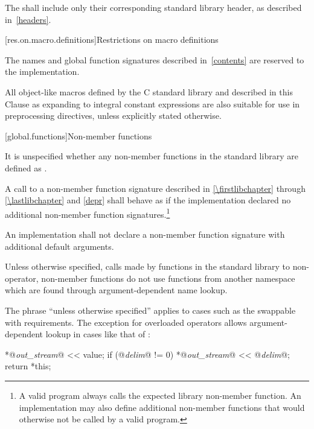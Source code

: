 \pnum
The 
shall include only their corresponding \Cpp{} standard library header,
as described in~\ref{headers}.

[res.on.macro.definitions]{Restrictions on macro definitions}
%

\pnum
The names and global function signatures described in~\ref{contents} are
reserved to the implementation.
%
%
%
%
%

\pnum
All object-like macros defined by the C standard library and described in this
Clause as expanding to integral constant expressions are also suitable for use
in  preprocessing directives, unless
explicitly stated otherwise.

[global.functions]{Non-member functions}

\pnum
It is unspecified whether any
non-member
functions in the \Cpp{} standard library are defined as
.

\pnum
A call to a non-member function signature
described in \ref{\firstlibchapter} through \ref{\lastlibchapter} and
\ref{depr} shall behave as if the implementation declared no additional
non-member function signatures.\footnote{A valid \Cpp{} program always
calls the expected library non-member function. An implementation may
also define additional non-member functions that would otherwise not
be called by a valid \Cpp{} program.}

\pnum
An implementation shall not declare a non-member function signature
with additional default arguments.

\pnum
Unless otherwise specified,
calls made by functions in the standard library to non-operator, non-member functions
do not use functions from another namespace which are found through
argument-dependent name lookup.
\begin{note}
The phrase ``unless otherwise specified'' applies to cases such as
the swappable with requirements.
The exception for overloaded operators allows argument-dependent lookup
in cases like that of
:

\effects
\begin{codeblock}
*@\textit{out_stream}@ << value;
if (@\textit{delim}@ != 0)
  *@\textit{out_stream}@ << @\textit{delim}@;
return *this;
\end{codeblock}
\end{note}

